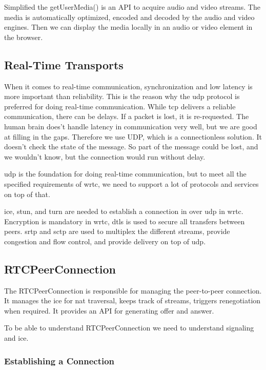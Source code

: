 Simplified the getUserMedia() is an API to acquire audio and video streams. The media is automatically optimized, encoded and decoded by the audio and video engines. Then we can display the media locally in an audio or video element in the browser.


\subsection{Real-Time Transports}
When it comes to real-time communication, synchronization and low latency is more important than reliability. This is the reason why the \gls{udp} protocol is preferred for doing real-time communication. While \gls{tcp} delivers a reliable communication, there can be delays. If a packet is lost, it is re-requested. The human brain does't handle latency in communication very well, but we are good at filling in the gaps. Therefore we use UDP, which is a connectionless solution. It doesn't check the state of the message. So part of the message could be lost, and we wouldn't know, but the connection would run without delay.

\gls{udp} is the foundation for doing real-time communication, but to meet all the specified requirements of \gls{wrtc}, we need to support a lot of protocols and services on top of that.

\gls{ice}, \gls{stun}, and \gls{turn} are needed to establish a connection in over \gls{udp} in \gls{wrtc}. Encryption is mandatory in \gls{wrtc}, \gls{dtls} is used to secure all transfers between peers. \gls{srtp} and \gls{sctp} are used to multiplex the different streams, provide congestion and flow control, and provide delivery on top of \gls{udp}.

\subsection{RTCPeerConnection}
The RTCPeerConnection is responsible for managing the peer-to-peer connection. It manages the \gls{ice} for \gls{nat} traversal, keeps track of streams, triggers renegotiation when required. It provides an API for generating offer and answer.

To be able to understand RTCPeerConnection we need to understand signaling and \gls{ice}.

\subsubsection{Establishing a Connection}

